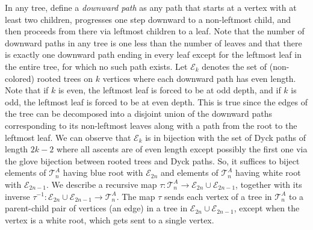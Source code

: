 \documentclass[12pt]{amsart}
\begin{document}
In any tree, define a \emph{downward path} as any path that starts at a vertex with at least two children, progresses one step downward to a non-leftmost child, and then proceeds from there via leftmost children to a leaf.
Note that the number of downward paths in any tree is one less than the number of leaves and that there is exactly one downward path ending in every leaf except for the leftmost leaf in the entire tree, for which no such path exists.
Let $\mathcal{E}_k$
denotes the set of (non-colored) rooted trees on $k$ vertices where each 
downward path has even length.
Note that if $k$ is even, the leftmost leaf is forced to be at odd depth, and if $k$ is odd, the leftmost leaf is forced to be at even depth. 
This is true since the edges of the tree can be decomposed into a disjoint union of the downward paths corresponding to its non-leftmost leaves along with a path from the root to the leftmost leaf.
We can
observe that $\mathcal{E}_k$ is in bijection with the set of Dyck paths of length $2k-2$ where all ascents are of even length except possibly the first one via the glove bijection between rooted trees and Dyck paths.
So, it suffices to biject elements of $\mathcal{T}_n^{A}$ having blue root with $\mathcal{E}_{2n}$ and elements of $\mathcal{T}_n^{A}$ having white root with $\mathcal{E}_{2n-1}$. We describe a recursive map $\tau:\mathcal{T}_n^{A}\to\mathcal{E}_{2n}\cup\mathcal{E}_{2n-1}$, together with its inverse $\tau^{-1}:\mathcal{E}_{2n}\cup\mathcal{E}_{2n-1}\to\mathcal{T}_n^{A}$. The map $\tau$ sends each vertex of a tree in $\mathcal{T}_n^A$ to a parent-child pair of vertices (an edge) in a tree in $\mathcal{E}_{2n}\cup\mathcal{E}_{2n-1}$, except when the vertex is a white root, which gets sent to a single vertex.
\end{document}
